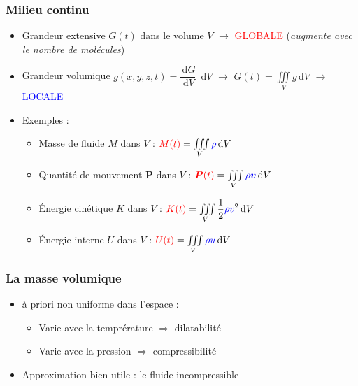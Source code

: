 \documentclass[%
	final, %
	 10pt, %
 	compress, %
hyperref={bookmarks=true}	
]{beamer}
\renewcommand{\v}[1]{\ensuremath{\bm{#1}}} %
\newcommand{\ddr}[1]{\, \mathrm{d} #1}
\begin{document}
\begin{frame}
\begin{figure}
\end{figure}
\end{frame}


\begin{frame}\frametitle{Milieu continu }
\begin{itemize}
\item Grandeur extensive $G(t)$ dans le volume $V$ $\rightarrow$ \textcolor{red}{GLOBALE}
  (\textit{augmente avec le nombre de molécules})
\item Grandeur volumique $g(x,y,z,t) = \dfrac{\ddr G}{\ddr V}$ $\ddr
  V$ $\rightarrow$ $G(t) = \iiint\limits_{V} g \ddr V  $ $\rightarrow$
  \textcolor{blue}{LOCALE}
\item Exemples :
\begin{itemize}
\item Masse de fluide $M$ dans $V$ : ${\color{red} M(t)} = \iiint\limits_{V} \textcolor{blue}{\rho}
  \ddr V$
 \item Quantité de mouvement $\v{P}$ dans $V$ : ${\color{red}\v{P}(t)} = \iiint\limits_{V}
   \textcolor{blue}{\rho \v{v}}   \ddr V$
 \item Énergie cinétique $K$ dans $V$ : ${\color{red}K(t)} = \iiint\limits_{V}
  \dfrac{1}{2}\textcolor{blue}{\rho v}^{2} \ddr V$
 \item Énergie interne $U$ dans $V$ : ${\color{red}U(t)} = \iiint\limits_{V}
   \textcolor{blue}{\rho u} \ddr V$
 \end{itemize}
\end{itemize}
\end{frame}


\begin{frame}\frametitle{La masse volumique}
\begin{itemize}
\item à priori non uniforme dans l'espace :
\begin{itemize}
\item Varie avec la temprérature $\Rightarrow$ dilatabilité
\item Varie avec la pression $\Rightarrow$ compressibilité
\end{itemize}
\item Approximation bien utile : le fluide incompressible
\end{itemize}
\end{frame}
\end{document}
